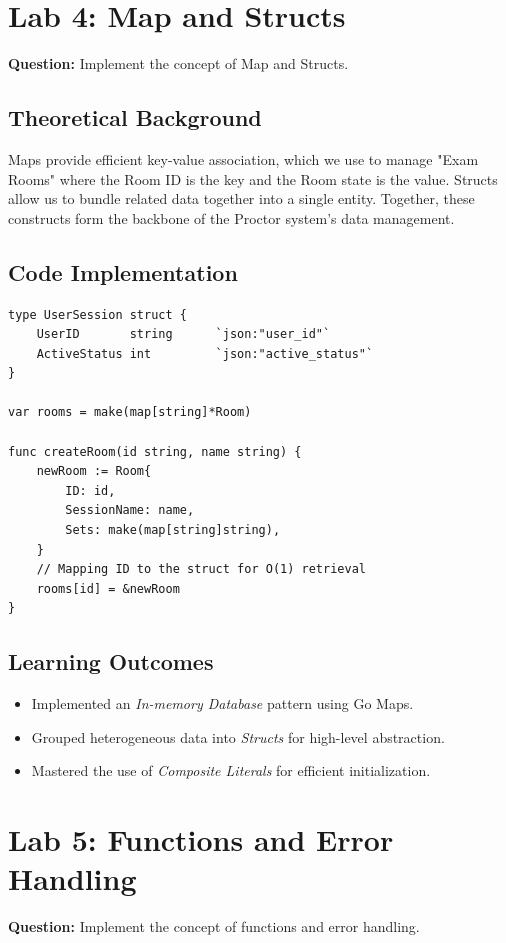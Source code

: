 \documentclass[12pt,a4paper]{article}
\begin{document}
\newpage
\section{Lab 4: Map and Structs}
\textbf{Question:} Implement the concept of Map and Structs.

\subsection{Theoretical Background}
Maps provide efficient key-value association, which we use to manage "Exam Rooms" where the Room ID is the key and the Room state is the value. Structs allow us to bundle related data together into a single entity. Together, these constructs form the backbone of the Proctor system's data management.

\subsection{Code Implementation}
\begin{lstlisting}
type UserSession struct {
	UserID       string      `json:"user_id"`
	ActiveStatus int         `json:"active_status"`
}

var rooms = make(map[string]*Room)

func createRoom(id string, name string) {
    newRoom := Room{
        ID: id,
        SessionName: name,
        Sets: make(map[string]string),
    }
    // Mapping ID to the struct for O(1) retrieval
    rooms[id] = &newRoom
}
\end{lstlisting}

\subsection{Learning Outcomes}
\begin{itemize}
    \item Implemented an \textit{In-memory Database} pattern using Go Maps.
    \item Grouped heterogeneous data into \textit{Structs} for high-level abstraction.
    \item Mastered the use of \textit{Composite Literals} for efficient initialization.
\end{itemize}

\newpage
\section{Lab 5: Functions and Error Handling}
\textbf{Question:} Implement the concept of functions and error handling.
\end{document}
